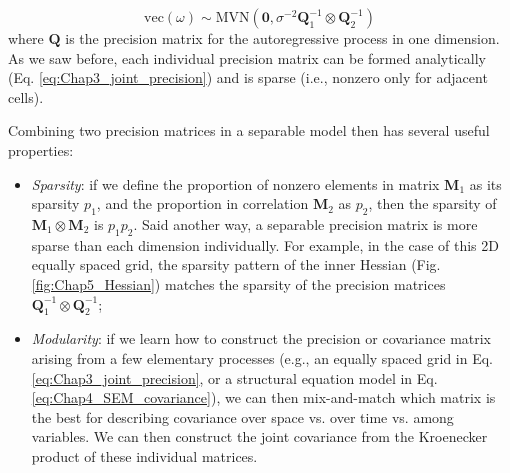 \begin{equation}
    \mathrm{vec}(\omega) \sim \mathrm{MVN}(\mathbf{0},\sigma^{-2} \mathbf{Q}_1^{-1} \otimes \mathbf{Q}_2^{-1})
\end{equation}
where \(\mathbf{Q}\) is the precision matrix for the autoregressive process in one dimension.  As we saw before, each individual precision matrix can be formed analytically (Eq. \ref{eq:Chap3_joint_precision}) and is sparse (i.e., nonzero only for adjacent cells).  

\lstset{style=TMBcode}


Combining two precision matrices in a separable model then has several useful properties:

\begin{itemize}
    \item \textit{Sparsity}:  if we define the proportion of nonzero elements in matrix \(\mathbf{M}_1\) as its sparsity \(p_1\), and the proportion in correlation \(\mathbf{M}_2\) as \(p_2\), then the sparsity of \( \mathbf{M}_1 \otimes \mathbf{M}_2 \) is \(p_1 p_2\). Said another way, a separable precision matrix is more sparse than each dimension individually.  For example, in the case of this 2D equally spaced grid, the sparsity pattern of the inner Hessian (Fig. \ref{fig:Chap5_Hessian}) matches the sparsity of the precision matrices \( \mathbf{Q}_1^{-1} \otimes \mathbf{Q}_2^{-1} \);

    \item \textit{Modularity}:  if we learn how to construct the precision or covariance matrix arising from a few elementary processes (e.g., an equally spaced grid in Eq. \ref{eq:Chap3_joint_precision}, or a structural equation model in Eq. \ref{eq:Chap4_SEM_covariance}), we can then mix-and-match which matrix is the best for describing covariance over space vs. over time vs. among variables.  We can then construct the joint covariance from the Kroenecker product of these individual matrices.
\end{itemize}

